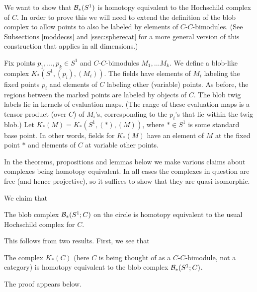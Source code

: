 We want to show that ${\mathcal B}_*(S^1)$ is homotopy equivalent to the
Hochschild complex of $C$.
In order to prove this we will need to extend the 
definition of the blob complex to allow points to also
be labeled by elements of $C$-$C$-bimodules.
(See Subsections \ref{moddecss} and \ref{ssec:spherecat} for a more general version of this construction that applies in all dimensions.)

Fix points $p_1, \ldots, p_k \in S^1$ and $C$-$C$-bimodules $M_1, \ldots M_k$.
We define a blob-like complex $K_*(S^1, (p_i), (M_i))$.
The fields have elements of $M_i$ labeling 
the fixed points $p_i$ and elements of $C$ labeling other (variable) points.
As before, the regions between the marked points are labeled by
objects of $C$.
The blob twig labels lie in kernels of evaluation maps.
(The range of these evaluation maps is a tensor product (over $C$) of $M_i$'s,
corresponding to the $p_i$'s that lie within the twig blob.)
Let $K_*(M) = K_*(S^1, (*), (M))$, where $* \in S^1$ is some standard base point.
In other words, fields for $K_*(M)$ have an element of $M$ at the fixed point $*$
and elements of $C$ at variable other points.

In the theorems, propositions and lemmas below we make various claims
about complexes being homotopy equivalent.
In all cases the complexes in question are free (and hence projective), 
so it suffices to show that they are quasi-isomorphic.

We claim that
\begin{thm}
\label{thm:hochschild}
The blob complex ${\mathcal B}_*(S^1; C)$ on the circle is homotopy equivalent to the
usual Hochschild complex for $C$.
\end{thm}

This follows from two results.
First, we see that
\begin{lem}
\label{lem:module-blob}%
The complex $K_*(C)$ (here $C$ is being thought of as a
$C$-$C$-bimodule, not a category) is homotopy equivalent to the blob complex
${\mathcal B}_*(S^1; C)$.
\end{lem}
The proof appears below.

